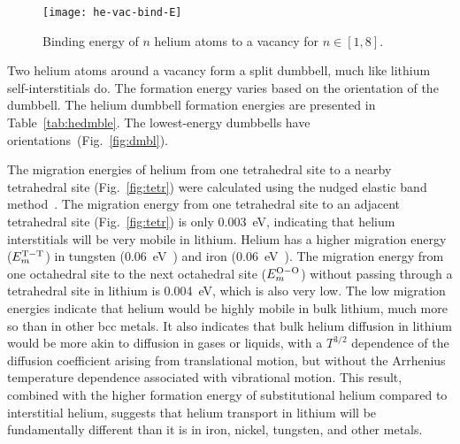\begin{figure}
  \centering
  \texttt{[image: he-vac-bind-E]}
  \caption{Binding energy of $n$ helium atoms to a vacancy for $n \in [1,8]$.}
  \label{fig:he-bind}
\end{figure}

Two helium atoms around a vacancy form a split dumbbell, much like lithium
self-interstitials do. The formation energy varies based on the orientation of
the dumbbell. The helium dumbbell formation energies are presented in
Table~\ref{tab:hedmble}.
The lowest-energy dumbbells have  orientations~(Fig.~\ref{fig:dmbl}).

The migration energies of helium from one tetrahedral site to a nearby tetrahedral site (Fig.~\ref{fig:tetr}) were calculated using the nudged elastic band
method~\cite{Jonsson1998, henkelman2000climbing, henkelman2000improved}.
The migration energy from one tetrahedral site to an adjacent tetrahedral site
(Fig.~\ref{fig:tetr}) is only 0.003~eV, indicating that helium interstitials
will be very mobile in lithium. Helium has a higher migration energy
($E_{m}^{\ce{T-T}}$) in tungsten (0.06~eV~\cite{Becquart2006}) and
iron (0.06~eV~\cite{fu2005}).
The migration energy from one octahedral site to the next octahedral
site ($E_{m}^{\ce{O-O}}$) without passing through a tetrahedral site in lithium
is 0.004~eV, which is also very low.
The low migration energies indicate that helium would be highly mobile in bulk
lithium, much more so than in other bcc metals. It also indicates that bulk
helium diffusion in lithium would be more akin to diffusion in gases or
liquids, with a $T^{3/2}$ dependence of the diffusion coefficient arising from
translational motion, but without the Arrhenius temperature dependence
associated with vibrational motion. This result, combined with the higher
formation energy of substitutional helium compared to interstitial helium,
suggests that helium transport in lithium will be fundamentally different than
it is in iron, nickel, tungsten, and other metals.


\clearpage



